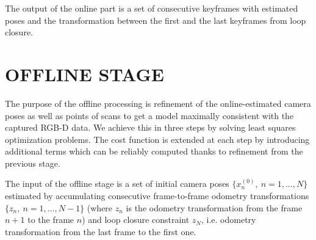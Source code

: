 \documentclass[letterpaper, 10 pt, conference]{ieeeconf}  %
\begin{document}
The output of the online part is a set of consecutive keyframes with 
estimated poses and the transformation between the first and the last 
keyframes from loop closure.


\section{OFFLINE STAGE}

The purpose of the offline processing is refinement of the online-estimated 
camera poses as well as points of scans to get a model maximally 
consistent with the captured RGB-D data. We achieve this in three steps by 
solving least squares optimization problems. The cost function is extended at each step 
by introducing additional terms which can be reliably computed
thanks to refinement from the previous stage.


The input of the offline stage is a set of initial camera poses $\{x_n^{(0)},~n=1,\dots, N\}$ 
estimated by accumulating consecutive frame-to-frame odometry transformations 
$\{z_n,~n=1,\dots, N-1\}$  
(where $z_n$ is the odometry transformation from the frame $n+1$ to the frame $n$)
and loop closure constraint $z_{N}$, 
i.e. odometry transformation from the last frame to the first one.
\end{document}
